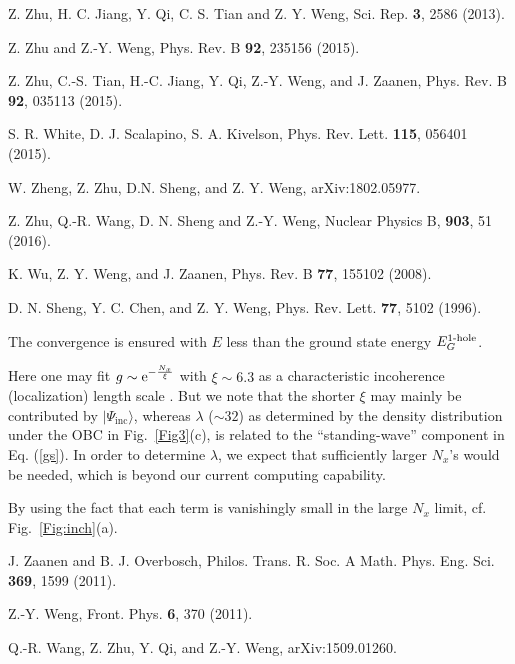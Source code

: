\documentclass[aps,prb,twocolumn,notitlepage,superscriptaddress,showpacs]{revtex4-1}
\begin{document}
\begin{thebibliography}{99}
  Z. Zhu, H. C. Jiang, Y. Qi, C. S. Tian and Z. Y. Weng, Sci. Rep. \textbf{3}, 2586 (2013).

   Z. Zhu and Z.-Y. Weng, Phys. Rev. B \textbf{92}, 235156 (2015).

   Z. Zhu, C.-S. Tian, H.-C. Jiang, Y. Qi, Z.-Y. Weng, and J. Zaanen, Phys. Rev. B \textbf{92}, 035113 (2015).

 S. R. White, D. J. Scalapino, S. A. Kivelson, Phys. Rev. Lett. \textbf{115}, 056401 (2015).

 W. Zheng, Z. Zhu, D.N. Sheng, and Z. Y. Weng, arXiv:1802.05977.

 Z. Zhu, Q.-R. Wang, D. N. Sheng and Z.-Y. Weng, Nuclear Physics B, \textbf{903}, 51 (2016).

 K. Wu, Z. Y. Weng, and J. Zaanen, Phys. Rev. B \textbf{77}, 155102 (2008).

 D. N. Sheng, Y. C. Chen, and Z. Y. Weng, Phys. Rev. Lett. \textbf{77}, 5102 (1996).

 The convergence is ensured \cite{Sheng1996} with $E$ less than the ground state energy $E_G^{\protect \text {1-hole}}$.

 Here one may fit $g\sim \protect \mathrm {e}^{-\protect
  \frac {N_x}{\xi }}$ with $\xi \sim 6.3$ as a characteristic incoherence
  (localization) length scale \cite {ZZ2013}. But we note that the shorter $\xi $ may mainly be contributed by $|\Psi_{\mathrm {inc}}\rangle$, whereas $\lambda$
  ($\sim 32$) as determined by the density distribution under the OBC in Fig.~\ref{Fig3}(c), is related to the ``standing-wave'' component in Eq. (\ref{gs}). In order to determine $\lambda$, we expect that sufficiently larger $N_x$'s would be needed, which is beyond our current computing capability.

 By using the fact that each term is vanishingly small in the
  large $N_x$ limit, cf. Fig.~\ref {Fig:inch}(a).

 J. Zaanen and B. J. Overbosch, Philos. Trans. R. Soc. A Math. Phys. Eng. Sci. \textbf{369}, 1599 (2011).

 Z.-Y. Weng, Front. Phys. \textbf{6}, 370 (2011).

 Q.-R. Wang, Z. Zhu, Y. Qi, and Z.-Y. Weng, arXiv:1509.01260.



\end{thebibliography}
\end{document}
